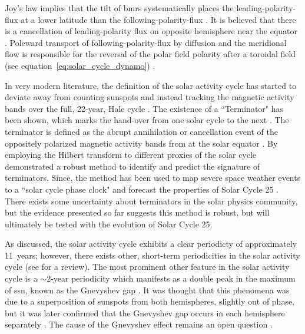 Joy's law implies that the tilt of \glspl{bmr} systematically places the leading-polarity-flux at a lower latitude than the following-polarity-flux \citep{hathaway_solar_2015}. It is believed that there is a cancellation of leading-polarity flux on opposite hemisphere near the equator \citep{dasi-espuig_sunspot_2010}. Poleward transport of following-polarity-flux by diffusion and the meridional flow is responsible for the reversal of the polar field polarity after a toroidal field (see equation~\ref{eq:solar_cycle_dynamo}) \citep{sheeley_surface_2005, charbonneau_dynamo_2020}.

In very modern literature, the definition of the solar activity cycle has started to deviate away from counting sunspots and instead tracking the magnetic activity bands over the full, 22-year, Hale cycle \citep{leamon_termination_2018, leamon_timing_2020}. The existence of a ``Terminator" has been shown, which marks the hand-over from one solar cycle to the next \citep{mcintosh_deciphering_2014, mcintosh_what_2019}. The terminator is defined as the abrupt annihilation or cancellation event of the oppositely polarized magnetic activity bands from at the solar equator \citep{mcintosh_what_2019}. By employing the Hilbert transform to different proxies of the solar cycle \citet{leamon_timing_2020} demonstrated a robust method to identify and predict the signature of terminators. Since, the method has been used to map severe space weather events to a ``solar cycle phase clock" \citep{chapman_quantifying_2020} and forecast the properties of Solar Cycle 25 \citep{mcintosh_overlapping_2020}. There exists some uncertainty about terminators in the solar physics community, but the evidence presented so far suggests this method is robust, but will ultimately be tested with the evolution of Solar Cycle 25.


As discussed, the solar activity cycle exhibits a clear periodicty of approximately 11~years; however, there exists other, short-term periodicities in the solar activity cycle (see \citet{hathaway_solar_2015} for a review). The most prominent other feature in the solar activity cycle is a $\sim2$-year periodicity which manifests as a double peak in the maximum of \gls{ssn}, known as the Gnevyshev gap \citep{gnevyshev_corona_1963, gnevyshev_11-years_1967}. It was thought that this phenomena was due to a superposition of sunspots from both hemispheres, slightly out of phase, but it was later confirmed that the Gnevyshev gap occurs in each hemisphere separately \citep{norton_solar-cycle_2009}. The cause of the Gnevyshev effect remains an open question \citep{hathaway_solar_2015}.

